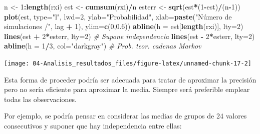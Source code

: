 \documentclass[]{book}
\newenvironment{Shaded}{\begin{snugshade}}{\end{snugshade}}
\newcommand{\KeywordTok}[1]{\textcolor[rgb]{0.13,0.29,0.53}{\textbf{#1}}}
\newcommand{\DataTypeTok}[1]{\textcolor[rgb]{0.13,0.29,0.53}{#1}}
\newcommand{\DecValTok}[1]{\textcolor[rgb]{0.00,0.00,0.81}{#1}}
\newcommand{\FloatTok}[1]{\textcolor[rgb]{0.00,0.00,0.81}{#1}}
\newcommand{\StringTok}[1]{\textcolor[rgb]{0.31,0.60,0.02}{#1}}
\newcommand{\CommentTok}[1]{\textcolor[rgb]{0.56,0.35,0.01}{\textit{#1}}}
\newcommand{\OperatorTok}[1]{\textcolor[rgb]{0.81,0.36,0.00}{\textbf{#1}}}
\newcommand{\NormalTok}[1]{#1}
\theoremstyle{definition}
\theoremstyle{definition}
\theoremstyle{definition}
\theoremstyle{remark}
\begin{document}
\begin{Shaded}
\begin{Highlighting}[]
\NormalTok{n <-}\StringTok{ }\DecValTok{1}\OperatorTok{:}\KeywordTok{length}\NormalTok{(rxi)}
\NormalTok{est <-}\StringTok{ }\KeywordTok{cumsum}\NormalTok{(rxi)}\OperatorTok{/}\NormalTok{n}
\NormalTok{esterr <-}\StringTok{ }\KeywordTok{sqrt}\NormalTok{(est}\OperatorTok{*}\NormalTok{(}\DecValTok{1}\OperatorTok{-}\NormalTok{est)}\OperatorTok{/}\NormalTok{(n}\OperatorTok{-}\DecValTok{1}\NormalTok{))}
\KeywordTok{plot}\NormalTok{(est, }\DataTypeTok{type=}\StringTok{"l"}\NormalTok{, }\DataTypeTok{lwd=}\DecValTok{2}\NormalTok{, }\DataTypeTok{ylab=}\StringTok{"Probabilidad"}\NormalTok{, }
     \DataTypeTok{xlab=}\KeywordTok{paste}\NormalTok{(}\StringTok{"Número de simulaciones /"}\NormalTok{, lag }\OperatorTok{+}\StringTok{ }\DecValTok{1}\NormalTok{), }\DataTypeTok{ylim=}\KeywordTok{c}\NormalTok{(}\DecValTok{0}\NormalTok{,}\FloatTok{0.6}\NormalTok{))}
\KeywordTok{abline}\NormalTok{(}\DataTypeTok{h =}\NormalTok{ est[}\KeywordTok{length}\NormalTok{(rxi)], }\DataTypeTok{lty=}\DecValTok{2}\NormalTok{)}
\KeywordTok{lines}\NormalTok{(est }\OperatorTok{+}\StringTok{ }\DecValTok{2}\OperatorTok{*}\NormalTok{esterr, }\DataTypeTok{lty=}\DecValTok{2}\NormalTok{) }\CommentTok{# Supone independencia}
\KeywordTok{lines}\NormalTok{(est }\OperatorTok{-}\StringTok{ }\DecValTok{2}\OperatorTok{*}\NormalTok{esterr, }\DataTypeTok{lty=}\DecValTok{2}\NormalTok{)}
\KeywordTok{abline}\NormalTok{(}\DataTypeTok{h =} \DecValTok{1}\OperatorTok{/}\DecValTok{3}\NormalTok{, }\DataTypeTok{col=}\StringTok{"darkgray"}\NormalTok{)     }\CommentTok{# Prob. teor. cadenas Markov}
\end{Highlighting}
\end{Shaded}

\begin{center}\texttt{[image: 04-Analisis\_resultados\_files/figure-latex/unnamed-chunk-17-2]} \end{center}

Esta forma de proceder podría ser adecuada para tratar de aproximar la
precisión pero no sería eficiente para aproximar la media. Siempre será
preferible emplear todas las observaciones.

Por ejemplo, se podría pensar en considerar las medias de grupos de 24
valores consecutivos y suponer que hay independencia entre ellas:
\end{document}
